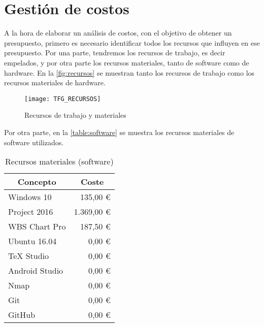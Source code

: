 

\section{Gestión de costos}
A la hora de elaborar un análisis de costos, con el objetivo de obtener un presupuesto, primero es necesario identificar todos los recursos que influyen en ese presupuesto. Por una parte, tendremos los recursos de trabajo, es decir empelados, y por otra parte los recursos materiales, tanto de software como de hardware. En la \autoref{fig:recursos} se muestran tanto los recursos de trabajo como los recursos materiales de hardware.

\begin{figure}[H]
	\centering
	\texttt{[image: TFG\_RECURSOS]}
	\caption{Recursos de trabajo y materiales}
	\label{fig:recursos}
\end{figure}

Por otra parte, en la \autoref{table:software} se muestra los recursos materiales de software utilizados.

\begin{table}[H]
	\centering
	\begin{tabular}{ |l|r| } 
		\hline
		\multicolumn{1}{|c|}{Concepto} & 
			\multicolumn{1}{|c|}{Coste} \\
		\hline
		Windows 10 		& 135,00 \euro \cite{precio-win10}		\\
		Project 2016 	& 1.369,00 \euro \cite{precio-project}	\\
		WBS Chart Pro 	& 187,50 \euro \cite{precio-wbs}		\\
		Ubuntu 16.04 	& 0,00 \euro							\\
		TeX Studio 		& 0,00 \euro							\\
		Android Studio 	& 0,00 \euro							\\
		Nmap 			& 0,00 \euro							\\
		Git 			& 0,00 \euro							\\
		GitHub 			& 0,00 \euro							\\
		\hline
	\end{tabular}
	\caption{Recursos materiales (software)}
	\label{table:software}
\end{table}


